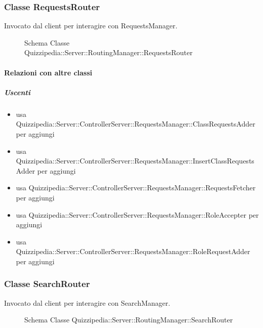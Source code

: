\subsubsection{Classe RequestsRouter}
Invocato dal client per interagire con RequestsManager.
\begin{figure}[H]
\centering
\noindent{}
\caption[Schema Classe RequestsRouter]{Schema Classe Quizzipedia::Server::RoutingManager::RequestsRouter}
\end{figure}
\paragraph{Relazioni con altre classi}
\subparagraph{Uscenti}
\begin{itemize}
\item usa Quizzipedia::Server::ControllerServer::RequestsManager::ClassRequestsAdder per aggiungi
\item usa Quizzipedia::Server::ControllerServer::RequestsManager::InsertClassRequestsAdder per aggiungi
\item usa Quizzipedia::Server::ControllerServer::RequestsManager::RequestsFetcher per aggiungi
\item usa Quizzipedia::Server::ControllerServer::RequestsManager::RoleAccepter per aggiungi
\item usa Quizzipedia::Server::ControllerServer::RequestsManager::RoleRequestAdder per aggiungi
\end{itemize}
\subsubsection{Classe SearchRouter}
Invocato dal client per interagire con SearchManager.
\begin{figure}[H]
\centering
\noindent{}
\caption[Schema Classe SearchRouter]{Schema Classe Quizzipedia::Server::RoutingManager::SearchRouter}
\end{figure}
